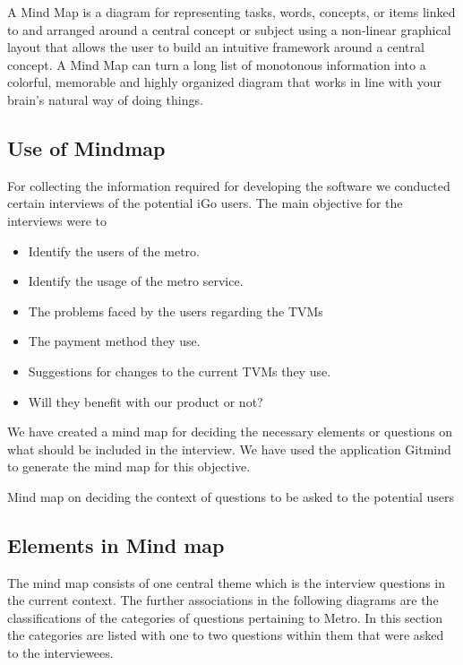 \documentclass[a4paper,12pt]{article}
\begin{document}
A Mind Map is a diagram for representing tasks, words, concepts, or items linked to and arranged around a central concept or subject using a non-linear graphical layout that allows the user to build an intuitive framework around a central concept. A Mind Map can turn a long list of monotonous information into a colorful, memorable and highly organized diagram that works in line with your brain's natural way of doing things.\par
\subsection{Use of Mindmap}
For collecting the information required for developing the software we conducted certain interviews of the potential iGo users. The main objective for the interviews were to 
\begin{itemize}[noitemsep]
    \item Identify the users of the metro.
    \item Identify the usage of the metro service.
    \item The problems faced by the users regarding the TVMs
    \item The payment method they use.
    \item Suggestions for changes to the current TVMs they use.
    \item Will they benefit with our product or not?
\end{itemize}
We have created a mind map for deciding the necessary elements or questions on what should be included in the interview. We have used the application Gitmind to generate the mind map for this objective.\\

\begin{center}
\caption{Mind map on deciding the context of questions to be asked to the potential users}
\end{center}

\subsection{Elements in Mind map}
The mind map consists of one central theme which is the interview questions in the current context. The further associations in the following diagrams are the classifications of the categories of questions pertaining to Metro. In this section the categories are listed with one to two questions within them that were asked to the interviewees. 
\end{document}
